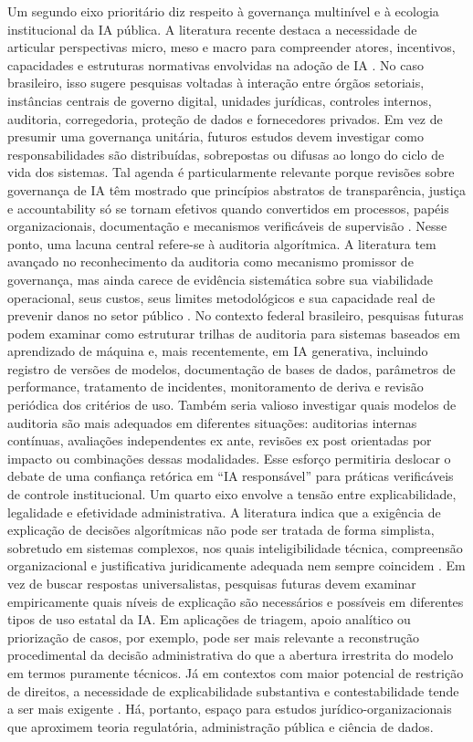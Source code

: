 \documentclass[12pt,a4paper]{article}
\begin{document}
Um segundo eixo prioritário diz respeito à governança multinível e à ecologia institucional da IA pública. A literatura recente destaca a necessidade de articular perspectivas micro, meso e macro para compreender atores, incentivos, capacidades e estruturas normativas envolvidas na adoção de IA \autocite{criado2024artificial}. No caso brasileiro, isso sugere pesquisas voltadas à interação entre órgãos setoriais, instâncias centrais de governo digital, unidades jurídicas, controles internos, auditoria, corregedoria, proteção de dados e fornecedores privados. Em vez de presumir uma governança unitária, futuros estudos devem investigar como responsabilidades são distribuídas, sobrepostas ou difusas ao longo do ciclo de vida dos sistemas. Tal agenda é particularmente relevante porque revisões sobre governança de IA têm mostrado que princípios abstratos de transparência, justiça e accountability só se tornam efetivos quando convertidos em processos, papéis organizacionais, documentação e mecanismos verificáveis de supervisão \autocite{batool2025ai} \autocite{goulart2025processos}.
Nesse ponto, uma lacuna central refere-se à auditoria algorítmica. A literatura tem avançado no reconhecimento da auditoria como mecanismo promissor de governança, mas ainda carece de evidência sistemática sobre sua viabilidade operacional, seus custos, seus limites metodológicos e sua capacidade real de prevenir danos no setor público \autocite{mkander2023auditing} \autocite{minkkinen2022continuous}. No contexto federal brasileiro, pesquisas futuras podem examinar como estruturar trilhas de auditoria para sistemas baseados em aprendizado de máquina e, mais recentemente, em IA generativa, incluindo registro de versões de modelos, documentação de bases de dados, parâmetros de performance, tratamento de incidentes, monitoramento de deriva e revisão periódica dos critérios de uso. Também seria valioso investigar quais modelos de auditoria são mais adequados em diferentes situações: auditorias internas contínuas, avaliações independentes ex ante, revisões ex post orientadas por impacto ou combinações dessas modalidades. Esse esforço permitiria deslocar o debate de uma confiança retórica em “IA responsável” para práticas verificáveis de controle institucional.
Um quarto eixo envolve a tensão entre explicabilidade, legalidade e efetividade administrativa. A literatura indica que a exigência de explicação de decisões algorítmicas não pode ser tratada de forma simplista, sobretudo em sistemas complexos, nos quais inteligibilidade técnica, compreensão organizacional e justificativa juridicamente adequada nem sempre coincidem \autocite{brkan2020legal}. Em vez de buscar respostas universalistas, pesquisas futuras devem examinar empiricamente quais níveis de explicação são necessários e possíveis em diferentes tipos de uso estatal da IA. Em aplicações de triagem, apoio analítico ou priorização de casos, por exemplo, pode ser mais relevante a reconstrução procedimental da decisão administrativa do que a abertura irrestrita do modelo em termos puramente técnicos. Já em contextos com maior potencial de restrição de direitos, a necessidade de explicabilidade substantiva e contestabilidade tende a ser mais exigente \autocite{parycek2023artificial}. Há, portanto, espaço para estudos jurídico-organizacionais que aproximem teoria regulatória, administração pública e ciência de dados.
\end{document}
